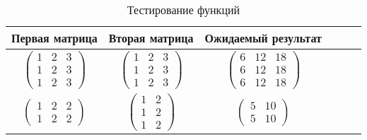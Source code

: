 \begin{table}[h!]
    \begin{center}
        \begin{threeparttable}
            \captionsetup{justification=raggedright,singlelinecheck=off}
            \caption{\label{tabular:test_rec} Тестирование функций}
            \begin{tabular}{|c|c|c|c|c|c|}
                \hline
                Первая матрица & Вторая матрица & Ожидаемый результат \\ \hline
                $\begin{pmatrix}
                     1 & 2 & 3\\
                     1 & 2 & 3\\
                     1 & 2 & 3
                \end{pmatrix}$ &
                $\begin{pmatrix}
                     1 & 2 & 3\\
                     1 & 2 & 3\\
                     1 & 2 & 3
                \end{pmatrix}$ &
                $\begin{pmatrix}
                     6 & 12 & 18\\
                     6 & 12 & 18\\
                     6 & 12 & 18
                \end{pmatrix}$ \\
                \hline
                $\begin{pmatrix}
                     1 & 2 & 2\\
                     1 & 2 & 2
                \end{pmatrix}$ &
                $\begin{pmatrix}
                     1 & 2\\
                     1 & 2\\
                     1 & 2
                \end{pmatrix}$ &
                $\begin{pmatrix}
                     5 & 10\\
                     5 & 10
                \end{pmatrix}$ \\

\end{tabular}
\end{threeparttable}
\end{center}
\end{table}
